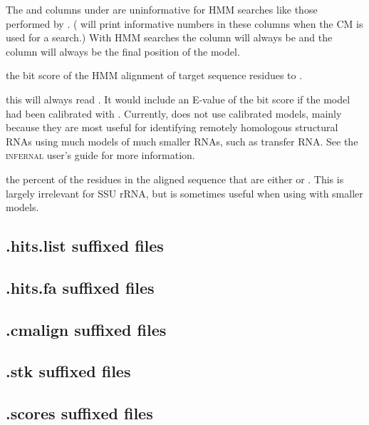 The  and  columns under  are
uninformative for HMM searches like those performed by
. ( will print informative numbers in
these columns when the CM is used for a search.) With HMM searches the
 column will always be  and the  column
will always be the final position of the model.

\begin{wideitem}

\item[\emprog{bit sc}] the bit score of the HMM alignment of
  target sequence residues  to .

\item[\emprog{E-value}] this will always read \prog{-}. It would
  include an E-value of the bit score if the model had been calibrated
  with . Currently,  does not use
  calibrated models, mainly because they are most useful for
  identifying remotely homologous structural RNAs using much models of
  much smaller RNAs, such as transfer RNA. See the \textsc{infernal}
  user's guide for more information.

\item[\emprog{GC\%}] the percent of the residues in the aligned
  sequence that are either  or . This is largely
  irrelevant for SSU rRNA, but is sometimes useful when using
   with smaller models.
\end{wideitem}

\subsection{.hits.list suffixed files}
\subsection{.hits.fa suffixed files}
\subsection{.cmalign suffixed files}
\subsection{.stk suffixed files}
\subsection{.scores suffixed files}


